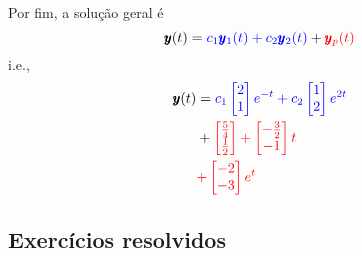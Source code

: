 \begin{ex}
Por fim, a solução geral é
\begin{equation}
  \pmb{y}(t) = {\color{blue}c_1\pmb{y}_1(t) + c_2\pmb{y}_2(t)} + {\color{red}\pmb{y}_p(t)}
\end{equation}
i.e.,
\begin{align}
  \pmb{y}(t) &= {\color{blue}c_1\begin{bmatrix}
                   2\\
                   1
                 \end{bmatrix}e^{-t}
  + c_2\begin{bmatrix}
                   1\\
                   2
                 \end{bmatrix}e^{2t}}\\
  &+ {\color{red}\begin{bmatrix}
    \frac{5}{4} \\
    \frac{1}{2}
  \end{bmatrix}
  +   \begin{bmatrix}
    -\frac{3}{2} \\
    -1
  \end{bmatrix}t}\\
  &{\color{red}+   \begin{bmatrix}
    -2 \\
    -3
  \end{bmatrix}e^t}
\end{align}
\end{ex}

\subsection*{Exercícios resolvidos}

